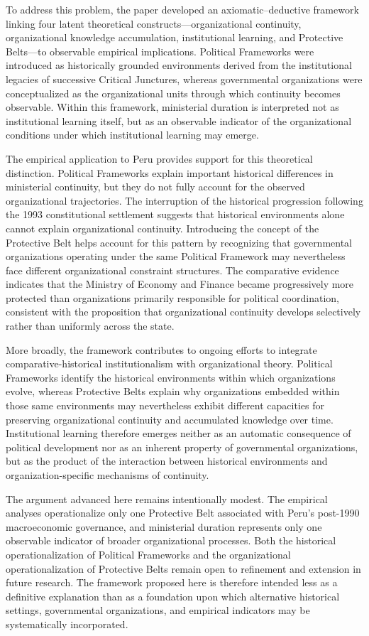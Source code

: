 \documentclass[doc, 12pt, a4paper,floatsintext]{apa7}
\begin{document}
To address this problem, the paper developed an axiomatic--deductive framework linking four latent theoretical constructs---organizational continuity, organizational knowledge accumulation, institutional learning, and Protective Belts---to observable empirical implications. Political Frameworks were introduced as historically grounded environments derived from the institutional legacies of successive Critical Junctures, whereas governmental organizations were conceptualized as the organizational units through which continuity becomes observable. Within this framework, ministerial duration is interpreted not as institutional learning itself, but as an observable indicator of the organizational conditions under which institutional learning may emerge.

The empirical application to Peru provides support for this theoretical distinction. Political Frameworks explain important historical differences in ministerial continuity, but they do not fully account for the observed organizational trajectories. The interruption of the historical progression following the 1993 constitutional settlement suggests that historical environments alone cannot explain organizational continuity. Introducing the concept of the Protective Belt helps account for this pattern by recognizing that governmental organizations operating under the same Political Framework may nevertheless face different organizational constraint structures. The comparative evidence indicates that the Ministry of Economy and Finance became progressively more protected than organizations primarily responsible for political coordination, consistent with the proposition that organizational continuity develops selectively rather than uniformly across the state.

More broadly, the framework contributes to ongoing efforts to integrate comparative-historical institutionalism with organizational theory. Political Frameworks identify the historical environments within which organizations evolve, whereas Protective Belts explain why organizations embedded within those same environments may nevertheless exhibit different capacities for preserving organizational continuity and accumulated knowledge over time. Institutional learning therefore emerges neither as an automatic consequence of political development nor as an inherent property of governmental organizations, but as the product of the interaction between historical environments and organization-specific mechanisms of continuity.

The argument advanced here remains intentionally modest. The empirical analyses operationalize only one Protective Belt associated with Peru's post-1990 macroeconomic governance, and ministerial duration represents only one observable indicator of broader organizational processes. Both the historical operationalization of Political Frameworks and the organizational operationalization of Protective Belts remain open to refinement and extension in future research. The framework proposed here is therefore intended less as a definitive explanation than as a foundation upon which alternative historical settings, governmental organizations, and empirical indicators may be systematically incorporated.
\end{document}
